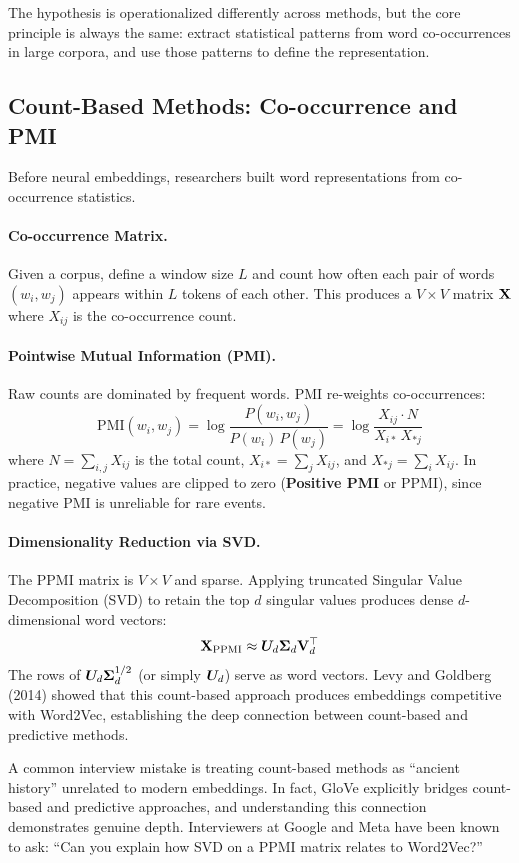 The hypothesis is operationalized differently across methods, but the core
principle is always the same: extract statistical patterns from word
co-occurrences in large corpora, and use those patterns to define the
representation.

\subsection{Count-Based Methods: Co-occurrence and PMI}

Before neural embeddings, researchers built word representations from
co-occurrence statistics.

\paragraph{Co-occurrence Matrix.}
Given a corpus, define a window size $L$ and count how often each pair of words
$(w_i, w_j)$ appears within $L$ tokens of each other.  This produces a
$V \times V$ matrix $\mathbf{X}$ where $X_{ij}$ is the co-occurrence count.

\paragraph{Pointwise Mutual Information (PMI).}
Raw counts are dominated by frequent words.  PMI re-weights co-occurrences:
\[
    \text{PMI}(w_i, w_j)
    = \log \frac{P(w_i, w_j)}{P(w_i)\, P(w_j)}
    = \log \frac{X_{ij} \cdot N}{X_{i*}\, X_{*j}}
\]
where $N = \sum_{i,j} X_{ij}$ is the total count, $X_{i*} = \sum_j X_{ij}$,
and $X_{*j} = \sum_i X_{ij}$.  In practice, negative values are clipped to
zero (\textbf{Positive PMI} or PPMI), since negative PMI is unreliable for
rare events.

\paragraph{Dimensionality Reduction via SVD.}
The PPMI matrix is $V \times V$ and sparse.  Applying truncated Singular Value
Decomposition (SVD) to retain the top $d$ singular values produces dense
$d$-dimensional word vectors:
\[
    \mathbf{X}_{\text{PPMI}} \approx \bm{U}_d \bm{\Sigma}_d \mathbf{V}_d^\top
\]
The rows of $\bm{U}_d \bm{\Sigma}_d^{1/2}$ (or simply $\bm{U}_d$) serve as word
vectors.  Levy and Goldberg (2014) showed that this count-based approach
produces embeddings competitive with Word2Vec, establishing the deep connection
between count-based and predictive methods.

\begin{warningbox}
A common interview mistake is treating count-based methods as ``ancient
history'' unrelated to modern embeddings.  In fact, GloVe explicitly bridges
count-based and predictive approaches, and understanding this connection
demonstrates genuine depth.  Interviewers at Google and Meta have been known
to ask: ``Can you explain how SVD on a PPMI matrix relates to Word2Vec?''
\end{warningbox}


